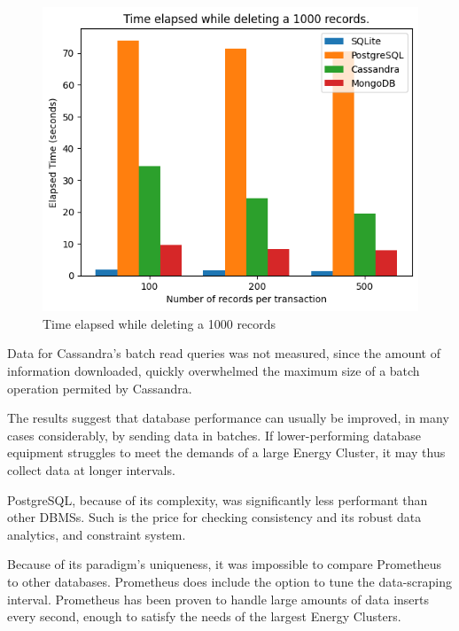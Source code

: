 \begin{figure}[htbp]
 \centering
 \includegraphics[width=1\textwidth]{gfx/delete}
 \caption{Time elapsed while deleting a 1000 records}
\end{figure}
\par Data for Cassandra's batch read queries was not measured, since the amount of information downloaded, quickly overwhelmed the maximum size of a batch operation permited by Cassandra.
\par The results suggest that database performance can usually be improved, in many cases considerably, by sending data in batches. If lower-performing database equipment struggles to meet the demands of a large Energy Cluster, it may thus collect data at longer intervals.
\par PostgreSQL, because of its complexity, was significantly less performant than other DBMSs. Such is the price for checking consistency and its robust data analytics, and constraint system.
\par Because of its paradigm's uniqueness, it was impossible to compare Prometheus to other databases. Prometheus does include the option to tune the data-scraping interval. Prometheus has been proven to handle large amounts of data inserts every second, enough to satisfy the needs of the largest Energy Clusters. \citep{prometheusSoundcloud}